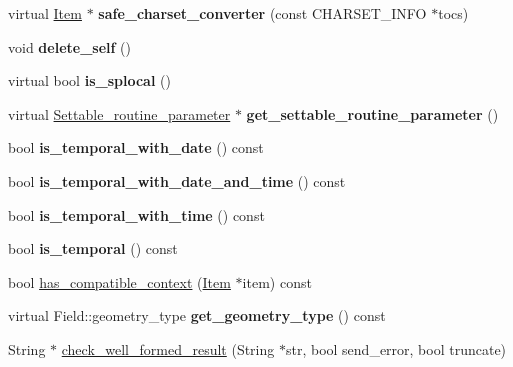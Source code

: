\begin{DoxyCompactItemize}
virtual \mbox{\hyperlink{classItem}{Item}} $\ast$ {\bfseries safe\+\_\+charset\+\_\+converter} (const C\+H\+A\+R\+S\+E\+T\+\_\+\+I\+N\+FO $\ast$tocs)
\item 
\mbox{\label{classItem_a7b5bec40da4e7c2dcab6eada1d46e14a}} 
void {\bfseries delete\+\_\+self} ()
\item 
\mbox{\label{classItem_a429edb0cfbcbabd48c3ebf5c3263ed5b}} 
virtual bool {\bfseries is\+\_\+splocal} ()
\item 
\mbox{\label{classItem_af245a2d1390c3be6618e0cebb29800b6}} 
virtual \mbox{\hyperlink{classSettable__routine__parameter}{Settable\+\_\+routine\+\_\+parameter}} $\ast$ {\bfseries get\+\_\+settable\+\_\+routine\+\_\+parameter} ()
\item 
\mbox{\label{classItem_a2dd09c302badf065170b8f59c17c31a7}} 
bool {\bfseries is\+\_\+temporal\+\_\+with\+\_\+date} () const
\item 
\mbox{\label{classItem_ac10df722459acd4f79e38971c4451031}} 
bool {\bfseries is\+\_\+temporal\+\_\+with\+\_\+date\+\_\+and\+\_\+time} () const
\item 
\mbox{\label{classItem_a71b2994aee88caa4a3f3db352eca8aa7}} 
bool {\bfseries is\+\_\+temporal\+\_\+with\+\_\+time} () const
\item 
\mbox{\label{classItem_abf0efe057406dd569b981447829ca6c0}} 
bool {\bfseries is\+\_\+temporal} () const
\item 
bool \mbox{\hyperlink{classItem_a7e19bfc78f1c2b4e50a82e4876e0eea8}{has\+\_\+compatible\+\_\+context}} (\mbox{\hyperlink{classItem}{Item}} $\ast$item) const
\item 
\mbox{\label{classItem_a05a2888f996d4c74ee972642d7c7864c}} 
virtual Field\+::geometry\+\_\+type {\bfseries get\+\_\+geometry\+\_\+type} () const
\item 
String $\ast$ \mbox{\hyperlink{classItem_ad28a9d3b48dd6e838b709d03b85f7eb1}{check\+\_\+well\+\_\+formed\+\_\+result}} (String $\ast$str, bool send\+\_\+error, bool truncate)
\item 
\mbox{\label{classItem_aaacc0c72728bb72256599c792407f700}} 

\end{DoxyCompactItemize}
